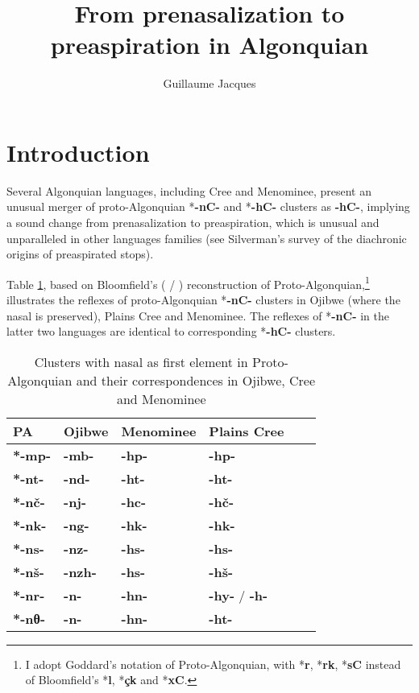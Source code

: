 \documentclass[oneside,a4paper,11pt]{article}
\newcommand{\ipa}[1]{{\phon\mbox{\textbf{#1}}}}
\begin{document}
 
\title{From prenasalization to preaspiration in Algonquian}
\author{Guillaume Jacques}
\maketitle
 
 \section{Introduction}
Several Algonquian languages, including Cree and Menominee, present an unusual merger of proto-Algonquian *\ipa{-nC-} and *\ipa{-hC-} clusters as \ipa{-hC-}, implying a sound change from prenasalization to preaspiration, which is unusual and unparalleled in other languages families (see Silverman's \citeyear{silverman03preaspirated} survey of the diachronic origins of preaspirated stops).


Table \ref{tab:nC.PA}, based on Bloomfield's (\citeyear[154-5]{bloomfield25central} / \citeyear{bloomfield46proto}) reconstruction of Proto-Algonquian,\footnote{I adopt Goddard's \citealt{goddard98arapaho} notation of Proto-Algonquian, with *\ipa{r}, *\ipa{rk}, *\ipa{sC} instead of Bloomfield's *\ipa{l}, *\ipa{çk} and *\ipa{xC}. } illustrates the reflexes of proto-Algonquian *\ipa{-nC-} clusters in Ojibwe (where the nasal is preserved), Plains Cree and Menominee. The reflexes of *\ipa{-nC-} in the latter two languages are identical to corresponding *\ipa{-hC-} clusters.
 
 \begin{table}
\caption{Clusters with nasal as first element in Proto-Algonquian and their correspondences in Ojibwe, Cree and Menominee} \label{tab:nC.PA} \centering
\begin{tabular}{llllll}
\toprule
PA & Ojibwe & Menominee & Plains Cree \\
\midrule
\ipa{*-mp-} & \ipa{-mb-} & \ipa{-hp-} & \ipa{-hp-} \\
\ipa{*-nt-} & \ipa{-nd-} & \ipa{-ht-} & \ipa{-ht-} \\
\ipa{*-nč-} & \ipa{-nj-} & \ipa{-hc-} & \ipa{-hč-} \\
\ipa{*-nk-} & \ipa{-ng-} & \ipa{-hk-} & \ipa{-hk-} \\
\ipa{*-ns-} & \ipa{-nz-} & \ipa{-hs-} & \ipa{-hs-} \\
\ipa{*-nš-} & \ipa{-nzh-} & \ipa{-hs-} & \ipa{-hš-} \\
\ipa{*-nr-} & \ipa{-n-} & \ipa{-hn-} & \ipa{-hy-} / \ipa{-h-} \\
\ipa{*-nθ-} & \ipa{-n-} & \ipa{-hn-} & \ipa{-ht-} \\
\bottomrule
\end{tabular}
\end{table}
\end{document}
